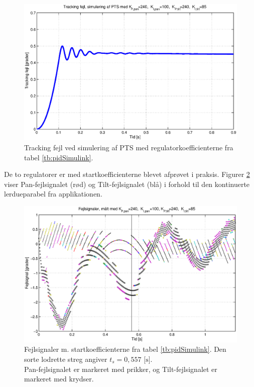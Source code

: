 \begin{figure}[h!]
\centering
\includegraphics[width=1\textwidth]{./graphics/pidSim1.eps}
\caption[Tracking fejl ved simulering]{Tracking fejl ved simulering af PTS med regulatorkoefficienterne fra tabel \ref{tb:pidSimulink}.} 
\label{fig:pidSim1}
\end{figure}

De to regulatorer er med startkoefficienterne blevet afprøvet i praksis.
Figurer \ref{fig:pidPhys1} viser Pan-fejlsignalet (rød) og Tilt-fejlsignalet (blå)
i forhold til den kontinuerte lerdueparabel fra applikationen.

\begin{figure}[h!]
\centering
\includegraphics[width=1\textwidth]{./graphics/pidPhys1.eps}
\caption[Fejlsignaler m. startkoefficienter]{Fejlsignaler m. startkoefficienterne fra tabel \ref{tb:pidSimulink}.
	Den sorte lodrette streg angiver \(t_s=0,557 \text{ [s]}\).\\
	Pan-fejlsignalet er markeret med prikker, og Tilt-fejlsignalet er markeret med krydser.} 
\label{fig:pidPhys1}
\end{figure}

